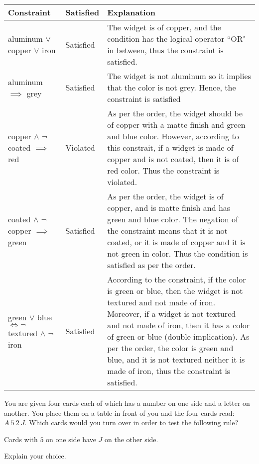 \documentclass[addpoints]{exam}
\begin{document}
\begin{questions}
\begin{parts}
\begin{solution}
    \begin{tabularx}{\textwidth}{l|l|X}
      Constraint & Satisfied & Explanation \\\hline\hline
      aluminum $\lor$ copper $\lor$ iron & Satisfied & The widget is of copper, and the condition has the logical operator ``OR" in between, thus the constraint is satisfied. \\\hline
      aluminum $\implies$ grey & Satisfied & The widget is not aluminum so it implies that the color is not grey. Hence, the constraint is satisfied \\\hline
      copper $\land$ $\neg$ coated $\implies$ red & Violated & As per the order, the widget should be of copper with a matte finish and green and blue color. However, according to this constrait, if a widget is made of copper and is not coated, then it is of red color. Thus the constraint is violated. \\\hline
      coated $\land$ $\neg$ copper $\implies$ green & Satisfied & As per the order, the widget is of copper, and is matte finish and has green and blue color. The negation of the constraint means that it is not coated, or it is made of copper and it is not green in color. Thus the condition is satisfied as per the order. \\\hline
      green $\lor$ blue $\iff \neg$ textured $\land$ $\neg$ iron & Satisfied & According to the constraint, if the color is green or blue, then the widget is not textured and not made of iron. Moreover, if a widget is not textured and not made of iron, then it has a color of green or blue (double implication). As per the order, the color is green and blue, and it is not textured neither it is made of iron, thus the constraint is satisfied.  
    \end{tabularx}
  \end{solution}

\end{parts}


\question[5] You are given four cards each of which has a number on one side and a letter on another. You place them on a table in front of you and the four cards read: $A\ 5\ 2\ J$. Which cards would you turn over in order to test the following rule? 
  \begin{center}
    Cards with $5$ on one side have $J$ on the other side.
  \end{center}
  Explain your choice.
  \begin{solution}


\end{solution}
\end{questions}
\end{document}
